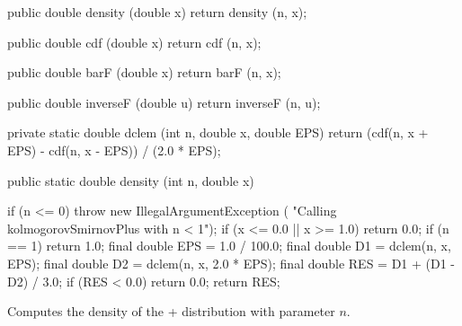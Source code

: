 \begin{code}\begin{hide}

   public double density (double x) {
      return density (n, x);
   }

   public double cdf (double x) {
      return cdf (n, x);
   }

   public double barF (double x) {
      return barF (n, x);
   }

   public double inverseF (double u) {
      return inverseF (n, u);
   }

   private static double dclem (int n, double x, double EPS) {
      return (cdf(n, x + EPS) - cdf(n, x - EPS)) / (2.0 * EPS);
   }\end{hide}

   public static double density (int n, double x)\begin{hide} {
      if (n <= 0)
        throw new IllegalArgumentException (
                             "Calling kolmogorovSmirnovPlus with n < 1");
      if (x <= 0.0 || x >= 1.0)
         return 0.0;
      if (n == 1)
         return 1.0;
      final double EPS = 1.0 / 100.0;
      final double D1 = dclem(n, x, EPS);
      final double D2 = dclem(n, x, 2.0 * EPS);
      final double RES = D1 + (D1 - D2) / 3.0;
      if (RES < 0.0)
         return 0.0;
      return RES;
   }\end{hide}
\end{code}
\begin{tabb} Computes the density of the \ks+ distribution with parameter $n$.
\end{tabb}
